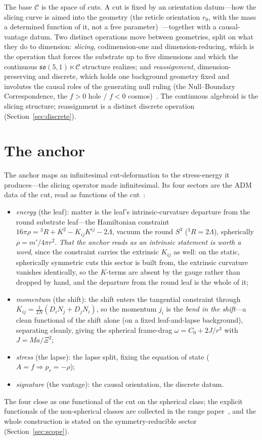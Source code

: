 \documentclass[11pt,a4paper]{article}
\theoremstyle{plain}
\theoremstyle{definition}
\theoremstyle{remark}
\newcommand{\so}{\mathfrak{so}}
\newcommand{\C}{\mathcal{C}}
\begin{document}
The base $\C$ is the space of cuts. A cut is fixed by an orientation datum---how the slicing curve is aimed into the geometry (the reticle orientation $r_0$, with the mass a determined function of it, not a free parameter)~\cite{JanzenSlicing}---together with a causal-vantage datum. Two distinct operations move between geometries, split on what they do to dimension: \emph{slicing}, codimension-one and dimension-reducing, which is the operation that forces the substrate up to five dimensions and which the continuous $\so(5,1)\ltimes\C$ structure realizes; and \emph{reassignment}, dimension-preserving and discrete, which holds one background geometry fixed and involutes the causal roles of the generating null ruling (the Null--Boundary Correspondence, the $f>0$ hole / $f<0$ cosmos)~\cite{JanzenCRframework}. The continuous algebroid is the slicing structure; reassignment is a distinct discrete operation (Section~\ref{sec:discrete}).

\section{The anchor}\label{sec:anchor}

The anchor maps an infinitesimal cut-deformation to the stress-energy it produces---the slicing operator made infinitesimal. Its four sectors are the ADM data of the cut, read as functions of the cut~\cite{JanzenOperator,JanzenRange}:
\begin{itemize}
\item \emph{energy} (the leaf): matter is the leaf's intrinsic-curvature departure from the round substrate leaf---the Hamiltonian constraint $16\pi\rho={}^3R+K^2-K_{ij}K^{ij}-2\Lambda$, vacuum the round $S^3$ (${}^3R=2\Lambda$), spherically $\rho=m'/4\pi r^2$. \emph{That the anchor reads as an intrinsic statement is worth a word}, since the constraint carries the extrinsic $K_{ij}$ as well: on the static, spherically symmetric cuts this sector is built from, the extrinsic curvature vanishes identically, so the $K$-terms are absent by the gauge rather than dropped by hand, and the departure from the round leaf is the whole of it;
\item \emph{momentum} (the shift): the shift enters the tangential constraint through $K_{ij}=\tfrac1{2N}(D_iN_j+D_jN_i)$, so the momentum $j_i$ is the \emph{bend in the shift}---a clean functional of the shift alone (on a fixed leaf-and-lapse background), separating cleanly, giving the spherical frame-drag $\omega=C_0+2J/r^3$ with $J=Ma/\Xi^2$;
\item \emph{stress} (the lapse): the lapse split, fixing the equation of state ($A=f\Rightarrow p_r=-\rho$);
\item \emph{signature} (the vantage): the causal orientation, the discrete datum.
\end{itemize}
The four close as one functional of the cut on the spherical class; the explicit functionals of the non-spherical classes are collected in the range paper~\cite{JanzenRange}, and the whole construction is stated on the symmetry-reducible sector (Section~\ref{sec:scope}).
\end{document}
